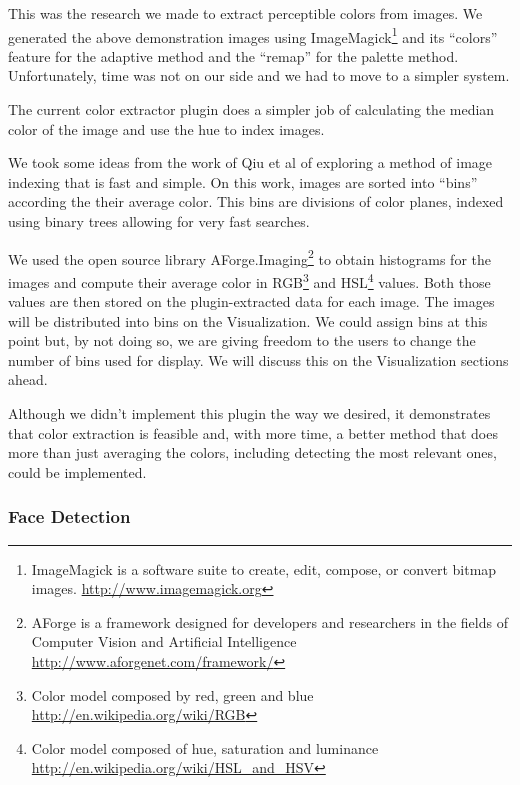 This was the research we made to extract perceptible colors from images. We generated the above demonstration images using ImageMagick\footnote{ImageMagick is a software suite to create, edit, compose, or convert bitmap images. \url{http://www.imagemagick.org}} and its ``colors'' feature for the adaptive method and the ``remap'' for the palette method. Unfortunately, time was not on our side and we had to move to a simpler system. 

The current color extractor plugin does a simpler job of calculating the median color of the image and use the hue to index images.

We took some ideas from the work of Qiu et al\cite{Qiu:2007p1207} of exploring a method of image indexing that is fast and simple. On this work, images are sorted into ``bins'' according the their average color. This bins are divisions of color planes, indexed using binary trees allowing for very fast searches.

We used the open source library AForge.Imaging\footnote{AForge is a framework designed for developers and researchers in the fields of Computer Vision and Artificial Intelligence \url{http://www.aforgenet.com/framework/}} to obtain histograms for the images and compute their average color in RGB\footnote{Color model composed by red, green and blue \url{http://en.wikipedia.org/wiki/RGB}} and HSL\footnote{Color model composed of hue, saturation and luminance \url{http://en.wikipedia.org/wiki/HSL_and_HSV}} values. Both those values are then stored on the plugin-extracted data for each image. The images will be distributed into bins on the Visualization. We could assign bins at this point but, by not doing so, we are giving freedom to the users to change the number of bins used for display. We will discuss this on the Visualization sections ahead.


Although we didn't implement this plugin the way we desired, it demonstrates that color extraction is feasible and, with more time, a better method that does more than just averaging the colors, including detecting the most relevant ones, could be implemented.





\subsubsection{Face Detection} %
\label{ssub:face_detection}

